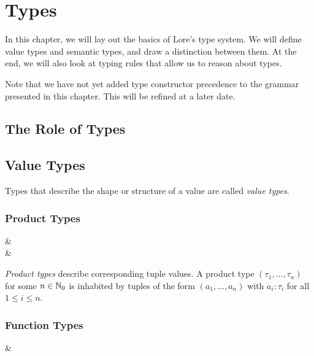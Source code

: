 \chapter{Types}

In this chapter, we will lay out the basics of Lore's type system. We will define value types and semantic types, and draw a distinction between them. At the end, we will also look at typing rules that allow us to reason about types.

Note that we have not yet added type constructor precedence to the grammar presented in this chapter. This will be refined at a later date. 



\section{The Role of Types}



\section{Value Types}

Types that describe the shape or structure of a value are called \textit{value types}.


\subsection{Product Types}

\begin{grammar}
 &\produce {} \\
 &\produce {}
\end{grammar}

\noindent \textit{Product types} describe corresponding tuple values. A product type $(\tau_1, ..., \tau_n)$ for some $n \in \mathbb{N}_0$ is inhabited by tuples of the form $(a_1, ..., a_n)$ with $a_i : \tau_i$ for all $1 \leq i \leq n$.


\subsection{Function Types}

\begin{grammar}
 &\produce {}
\end{grammar}

